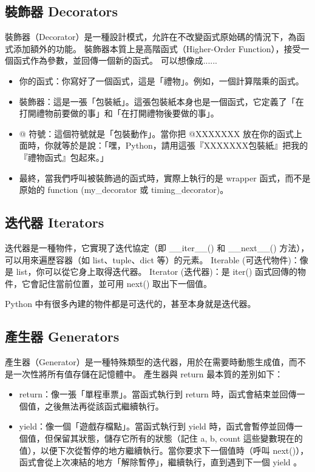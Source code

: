 \documentclass[a4paper,10pt,twocolumn,oneside]{article}
\begin{document}
\subsection{裝飾器 Decorators}
裝飾器（Decorator）是一種設計模式，允許在不改變函式原始碼的情況下，為函式添加額外的功能。
裝飾器本質上是高階函式（Higher-Order Function），接受一個函式作為參數，並回傳一個新的函式。
可以想像成......
\begin{itemize}
    \item 你的函式：你寫好了一個函式，這是「禮物」。例如，一個計算階乘的函式。
    \item 裝飾器：這是一張「包裝紙」。這張包裝紙本身也是一個函式，它定義了「在打開禮物前要做的事」和「在打開禮物後要做的事」。
    \item @ 符號：這個符號就是「包裝動作」。當你把 @XXXXXXX 放在你的函式上面時，你就等於是說：「嘿，Python，請用這張『XXXXXXX包裝紙』把我的『禮物函式』包起來。」
    \item 最終，當我們呼叫被裝飾過的函式時，實際上執行的是 wrapper 函式，而不是原始的 function (my\_decorator 或 timing\_decorator)。
\end{itemize}



\subsection{迭代器 Iterators}
迭代器是一種物件，它實現了迭代協定（即 \_\_iter\_\_() 和 \_\_next\_\_() 方法），可以用來遍歷容器（如 list、tuple、dict 等）的元素。
Iterable (可迭代物件)：像是 list，你可以從它身上取得迭代器。
Iterator (迭代器)：是 iter() 函式回傳的物件，它會記住當前位置，並可用 next() 取出下一個值。

Python 中有很多內建的物件都是可迭代的，甚至本身就是迭代器。


\subsection{產生器 Generators}
產生器（Generator）是一種特殊類型的迭代器，用於在需要時動態生成值，而不是一次性將所有值存儲在記憶體中。
產生器與 return 最本質的差別如下：
\begin{itemize}
    \item return：像一張「單程車票」。當函式執行到 return 時，函式會結束並回傳一個值，之後無法再從該函式繼續執行。
    \item yield：像一個「遊戲存檔點」。當函式執行到 yield 時，函式會暫停並回傳一個值，但保留其狀態，儲存它所有的狀態（記住 a, b, count 這些變數現在的值），以便下次從暫停的地方繼續執行。當你要求下一個值時（呼叫 next()），函式會從上次凍結的地方「解除暫停」，繼續執行，直到遇到下一個 yield 。
\end{itemize}

\end{document}
